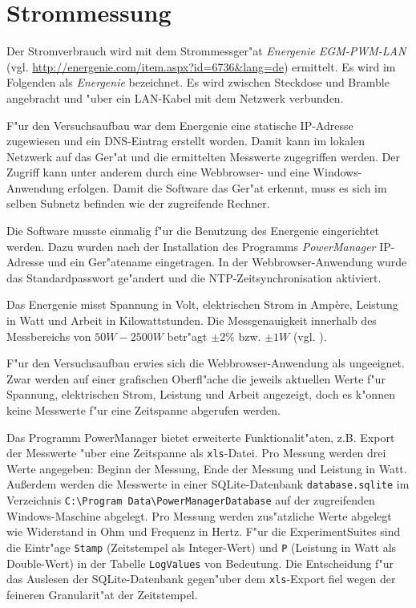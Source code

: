 \section{Strommessung}\label{Strommessung}
Der Stromverbrauch wird mit dem Strommessger"at \textit{Energenie EGM-PWM-LAN} (vgl. \url{http://energenie.com/item.aspx?id=6736&lang=de}) ermittelt. Es wird im Folgenden als \textit{Energenie} bezeichnet. Es wird zwischen Steckdose und Bramble angebracht und "uber ein LAN-Kabel mit dem Netzwerk verbunden. 

F"ur den Versuchsaufbau war dem Energenie eine statische IP-Adresse zugewiesen und ein DNS-Eintrag erstellt worden. Damit kann im lokalen Netzwerk auf das Ger"at und die ermittelten Messwerte zugegriffen werden. Der Zugriff kann unter anderem durch eine Webbrowser- und eine Windows-Anwendung erfolgen. Damit die Software das Ger"at erkennt, muss es sich im selben Subnetz befinden wie der zugreifende Rechner. 

Die Software musste einmalig f"ur die Benutzung des Energenie eingerichtet werden. Dazu wurden nach der Installation des Programms \textit{PowerManager} IP-Adresse und ein Ger"atename eingetragen. In der Webbrowser-Anwendung wurde das Standardpasswort ge"andert und die NTP-Zeitsynchronisation aktiviert. 

\noindent
Das Energenie misst Spannung in Volt, elektrischen Strom in Amp\`{e}re, Leistung in Watt und Arbeit in Kilowattstunden. Die Messgenauigkeit innerhalb des Messbereichs von $50 W - 2500 W$ betr"agt $\pm 2\%$ bzw. $\pm 1 W$ (vgl. \cite{scrguide03}). %

F"ur den Versuchsaufbau erwies sich die Webbrowser-Anwendung als ungeeignet. Zwar werden auf einer grafischen Oberfl"ache die jeweils aktuellen Werte f"ur Spannung, elektrischen Strom, Leistung und Arbeit angezeigt, doch es k"onnen keine Messwerte f"ur eine Zeitspanne abgerufen werden. 

Das Programm PowerManager bietet erweiterte Funktionalit"aten, z.B. Export der Messwerte "uber eine Zeitspanne als \texttt{xls}-Datei. Pro Messung werden drei Werte angegeben: Beginn der Messung, Ende der Messung und Leistung in Watt. Au\ss erdem werden die Messwerte in einer SQLite-Datenbank \texttt{database.sqlite} im Verzeichnis \texttt{C:\textbackslash Program Data\textbackslash PowerManagerData\-base} auf der zugreifenden Windows-Maschine abgelegt. Pro Messung werden zus"atzliche Werte abgelegt wie Widerstand in Ohm und Frequenz in Hertz. F"ur die ExperimentSuites sind die Eintr"age \texttt{Stamp} (Zeitstempel als Integer-Wert) und \texttt{P} (Leistung in Watt als Double-Wert) in der Tabelle \texttt{LogValues} von Bedeutung. Die Entscheidung f"ur das Auslesen der SQLite-Datenbank gegen"uber dem \texttt{xls}-Export fiel wegen der feineren Granularit"at der Zeitstempel. 

